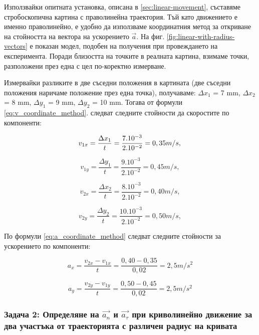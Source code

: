 \documentclass[12pt]{article}
\begin{document}
Използвайки опитната установка, описана в \ref{sec:linear-movement}, съставяме стробоскопична картина с праволинейна траектория. Тъй като движението е именно праволинейно, е удобно да използваме координатния метод за откриване на стойността на вектора на ускорението \(\vec{a}\). На фиг. \ref{fig:linear-with-radius-vectors} е показан модел, подобен на получения при провеждането на експеримента. Поради близостта на точките в реалната картина, взимаме точки, разположени през една с цел по-коректно измерване.

Измервайки разликите в две съседни положения в картината (две съседни положения наричаме положение през една точка), получаваме: \(\Delta x_1\) = 7 mm, \(\Delta x_2\) = 8 mm, \(\Delta y_1\) = 9 mm, \(\Delta y_2\) = 10 mm. Тогава от формули \ref{eq:v_coordinate_method}. следват следните стойности да скоростите по компоненти:

\begin{displaymath}
v_{1x} = \frac{\Delta x_1}{t} = \frac{7.10^{-3}}{2.10^{-2}} = 0,35 m/s, \\
\end{displaymath}

\begin{displaymath}
v_{1y} = \frac{\Delta y_1}{t} = \frac{9.10^{-3}}{2.10^{-2}} = 0,45 m/s,
\end{displaymath}

\begin{displaymath}
v_{2x} = \frac{\Delta x_2}{t} = \frac{8.10^{-3}}{2.10^{-2}} = 0,40 m/s,   
\end{displaymath}

\begin{displaymath}
v_{2y} = \frac{\Delta y_2}{t} = \frac{10.10^{-3}}{2.10^{-2}} = 0,50 m/s,    
\end{displaymath}

По формули \ref{eq:a_coordinate_method} следват следните стойности за ускорението по компоненти:

\begin{displaymath}
a_{x} = \frac{v_{2x} - v_{1x}}{t} = \frac{0,40 - 0,35}{0,02} = 2,5 m/s^2
\end{displaymath}

\begin{displaymath}
a_{y} = \frac{v_{2y} - v_{1y}}{t} = \frac{0,50 - 0,45}{0,02} = 2,5 m/s^2
\end{displaymath}


\subsubsection{Задача 2: Определяне на \(\vec{a_n}\) и \(\vec{a_\tau}\) при криволинейно движение за два участъка от траекторията с различен радиус на кривата}
\end{document}
